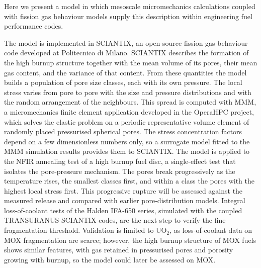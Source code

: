 \documentclass[11pt,a4paper]{article}
\begin{document}
Here we present a model in which mesoscale micromechanics calculations coupled with fission gas behaviour models supply this description within engineering fuel performance codes.


The model is implemented in SCIANTIX, an open-source fission gas behaviour code developed at Politecnico di Milano. SCIANTIX describes the formation of the high burnup structure together with the mean volume of its pores, their mean gas content, and the variance of that content. From these quantities the model builds a population of pore size classes, each with its own pressure. The local stress varies from pore to pore with the size and pressure distributions and with the random arrangement of the neighbours. This spread is computed with MMM, a micromechanics finite element application developed in the OperaHPC project, which solves the elastic problem on a periodic representative volume element of randomly placed pressurised spherical pores. The stress concentration factors depend on a few dimensionless numbers only, so a surrogate model fitted to the MMM simulation results provides them to SCIANTIX.
The model is applied to the NFIR annealing test of a high burnup fuel disc, a single-effect test that isolates the pore-pressure mechanism. The pores break progressively as the temperature rises, the smallest classes first, and within a class the pores with the highest local stress first. This progressive rupture will be assessed against the measured release and compared with earlier pore-distribution models. Integral loss-of-coolant tests of the Halden IFA-650 series, simulated with the coupled TRANSURANUS-SCIANTIX codes, are the next step to verify the fine fragmentation threshold.
Validation is limited to UO$_2$, as loss-of-coolant data on MOX fragmentation are scarce; however, the high burnup structure of MOX fuels shows similar features, with gas retained in pressurised pores and porosity growing with burnup, so the model could later be assessed on MOX.
\end{document}
